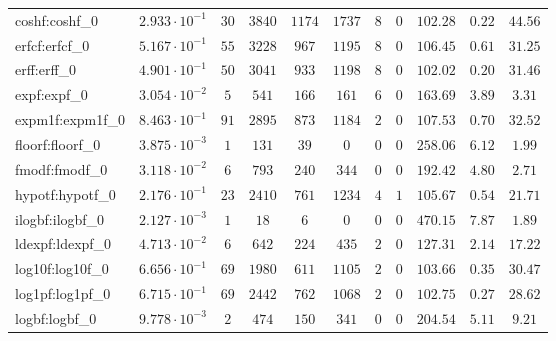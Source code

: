 \begin{tabular}{|l|c|c|c|c|c|c|c|c|c|c|}
coshf:coshf\_0               & $ 2.933 \cdot 10^{-1} $ & $ 30     $ & $ 3840  $ & $ 1174  $ & $ 1737  $ & $ 8   $ & $ 0 $ & $ 102.28      $ & $ 0.22    $ & $ 44.56   $ \\
erfcf:erfcf\_0               & $ 5.167 \cdot 10^{-1} $ & $ 55     $ & $ 3228  $ & $ 967   $ & $ 1195  $ & $ 8   $ & $ 0 $ & $ 106.45      $ & $ 0.61    $ & $ 31.25   $ \\
erff:erff\_0                 & $ 4.901 \cdot 10^{-1} $ & $ 50     $ & $ 3041  $ & $ 933   $ & $ 1198  $ & $ 8   $ & $ 0 $ & $ 102.02      $ & $ 0.20    $ & $ 31.46   $ \\
expf:expf\_0                 & $ 3.054 \cdot 10^{-2} $ & $ 5      $ & $ 541   $ & $ 166   $ & $ 161   $ & $ 6   $ & $ 0 $ & $ 163.69      $ & $ 3.89    $ & $ 3.31    $ \\
expm1f:expm1f\_0             & $ 8.463 \cdot 10^{-1} $ & $ 91     $ & $ 2895  $ & $ 873   $ & $ 1184  $ & $ 2   $ & $ 0 $ & $ 107.53      $ & $ 0.70    $ & $ 32.52   $ \\
floorf:floorf\_0             & $ 3.875 \cdot 10^{-3} $ & $ 1      $ & $ 131   $ & $ 39    $ & $ 0     $ & $ 0   $ & $ 0 $ & $ 258.06      $ & $ 6.12    $ & $ 1.99    $ \\
fmodf:fmodf\_0               & $ 3.118 \cdot 10^{-2} $ & $ 6      $ & $ 793   $ & $ 240   $ & $ 344   $ & $ 0   $ & $ 0 $ & $ 192.42      $ & $ 4.80    $ & $ 2.71    $ \\
hypotf:hypotf\_0             & $ 2.176 \cdot 10^{-1} $ & $ 23     $ & $ 2410  $ & $ 761   $ & $ 1234  $ & $ 4   $ & $ 1 $ & $ 105.67      $ & $ 0.54    $ & $ 21.71   $ \\
ilogbf:ilogbf\_0             & $ 2.127 \cdot 10^{-3} $ & $ 1      $ & $ 18    $ & $ 6     $ & $ 0     $ & $ 0   $ & $ 0 $ & $ 470.15      $ & $ 7.87    $ & $ 1.89    $ \\
ldexpf:ldexpf\_0             & $ 4.713 \cdot 10^{-2} $ & $ 6      $ & $ 642   $ & $ 224   $ & $ 435   $ & $ 2   $ & $ 0 $ & $ 127.31      $ & $ 2.14    $ & $ 17.22   $ \\
log10f:log10f\_0             & $ 6.656 \cdot 10^{-1} $ & $ 69     $ & $ 1980  $ & $ 611   $ & $ 1105  $ & $ 2   $ & $ 0 $ & $ 103.66      $ & $ 0.35    $ & $ 30.47   $ \\
log1pf:log1pf\_0             & $ 6.715 \cdot 10^{-1} $ & $ 69     $ & $ 2442  $ & $ 762   $ & $ 1068  $ & $ 2   $ & $ 0 $ & $ 102.75      $ & $ 0.27    $ & $ 28.62   $ \\
logbf:logbf\_0               & $ 9.778 \cdot 10^{-3} $ & $ 2      $ & $ 474   $ & $ 150   $ & $ 341   $ & $ 0   $ & $ 0 $ & $ 204.54      $ & $ 5.11    $ & $ 9.21    $ \\

\end{tabular}
